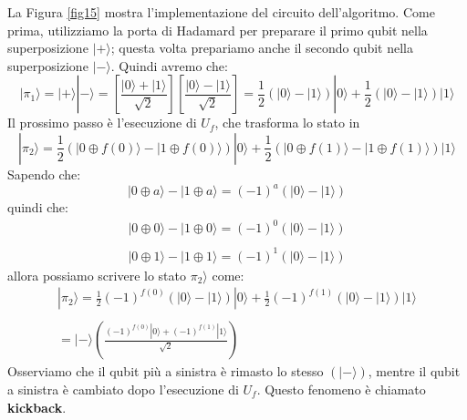La Figura \ref{fig15} mostra l'implementazione del circuito dell'algoritmo. Come prima, utilizziamo
la porta di Hadamard per preparare il primo qubit nella superposizione $|+\rangle$; questa volta prepariamo
anche il secondo qubit nella superposizione $|-\rangle$. Quindi avremo che:
\begin{equation*}
    |\pi_1\rangle = |+\rangle|-\rangle =  \left[\frac{|0\rangle + |1\rangle}{\sqrt{2}}\right]\left[\frac{|0\rangle - |1\rangle}{\sqrt{2}}\right]
    = \frac{1}{2}\left(|0\rangle - |1\rangle\right)|0\rangle + \frac{1}{2}\left(|0\rangle - |1\rangle\right)|1\rangle
\end{equation*}
Il prossimo passo è l'esecuzione di $U_f$, che trasforma lo stato in
\begin{equation*}
    |\pi_2\rangle = \frac{1}{2}\left(|0 \oplus f(0)\rangle - |1 \oplus f(0)\rangle \right)|0\rangle + \frac{1}{2}\left(|0 \oplus f(1)\rangle - |1 \oplus f(1)\rangle \right)|1\rangle
\end{equation*}
Sapendo che:
\begin{equation*}
    |0 \oplus a\rangle - |1 \oplus a\rangle = (-1)^a(|0\rangle - |1\rangle)
\end{equation*}
quindi che:
\begin{equation*}
    \begin{array}{c}
        |0 \oplus 0\rangle - |1 \oplus 0\rangle = (-1)^0(|0\rangle - |1\rangle) \\ \\
        |0 \oplus 1\rangle - |1 \oplus 1\rangle = (-1)^1(|0\rangle - |1\rangle)

    \end{array}
\end{equation*}
allora possiamo scrivere lo stato $\pi_2\rangle$ come:
\begin{equation*}
    \begin{array}{l}
        |\pi_2\rangle = \frac{1}{2}(-1)^{f(0)}(|0\rangle - |1\rangle)|0\rangle + \frac{1}{2}(-1)^{f(1)}(|0\rangle - |1\rangle)|1\rangle \\ \\
        = |-\rangle \left(\frac{(-1)^{f(0)}|0\rangle + (-1)^{f(1)}|1\rangle}{\sqrt{2}}\right)
    \end{array}
\end{equation*}
Osserviamo che il qubit più a sinistra è rimasto lo stesso $(|-\rangle)$, mentre il qubit a sinistra
è cambiato dopo l'esecuzione di $U_f$. Questo fenomeno è chiamato \textbf{kickback}.

